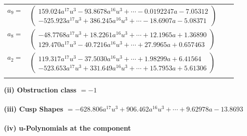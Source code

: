 \documentclass[1p]{elsarticle_modified}
\theoremstyle{definition}
\begin{document}
\begin{tabular}{m{7pt} m{180pt} m{7pt} m{180pt} }
\flushright $a_{9}=$&$\begin{pmatrix}159.024 a^{17} u^{3}-93.8678 a^{16} u^{3}+\cdots-0.0192247 a-7.05312\\-525.923 a^{17} u^{3}+386.245 a^{16} u^{3}+\cdots-18.6907 a-5.08371\end{pmatrix}$ \\
\flushright $a_{8}=$&$\begin{pmatrix}-48.7768 a^{17} u^{3}+18.2261 a^{16} u^{3}+\cdots+12.1965 a+1.36890\\129.470 a^{17} u^{3}-40.7216 a^{16} u^{3}+\cdots+27.9965 a+0.657463\end{pmatrix}$ \\
\flushright $a_{2}=$&$\begin{pmatrix}119.317 a^{17} u^{3}-37.5030 a^{16} u^{3}+\cdots+1.98299 a+6.41564\\-523.653 a^{17} u^{3}+331.649 a^{16} u^{3}+\cdots+15.7953 a+5.61306\end{pmatrix}$\\&\end{tabular}
\flushleft \textbf{(ii) Obstruction class $= -1$}\\~\\
\flushleft \textbf{(iii) Cusp Shapes $= -628.806 a^{17} u^{3}+906.462 a^{16} u^{3}+\cdots+9.62978 a-13.8693$}\\~\\
\newpage\renewcommand{\arraystretch}{1}
\flushleft \textbf{(iv) u-Polynomials at the component}\newline \\
\end{document}
